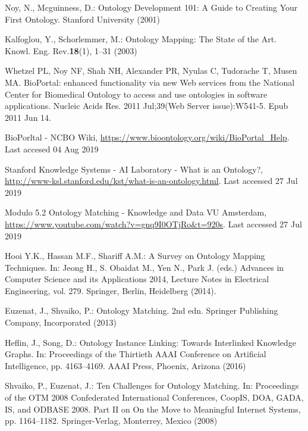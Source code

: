 \documentclass[runningheads]{llncs}
\begin{document}
%
%
%
% 
% 
%
\begin{thebibliography}{8}

Noy, N., Mcguinness, D.: Ontology Development 101: A Guide to Creating Your First Ontology. Stanford University (2001)

Kalfoglou, Y., Schorlemmer, M.: Ontology Mapping: The State of the Art. Knowl. Eng. Rev.\textbf{18}(1), 1--31 (2003)

Whetzel PL, Noy NF, Shah NH, Alexander PR, Nyulas C, Tudorache T, Musen MA. BioPortal: enhanced functionality via new Web services from the National Center for Biomedical Ontology to access and use ontologies in software applications. Nucleic Acids Res. 2011 Jul;39(Web Server issue):W541-5. Epub 2011 Jun 14.

BioPorltal - NCBO Wiki, \url{https://www.bioontology.org/wiki/BioPortal_Help}. Last accesed 04 Aug 2019

Stanford Knowledge Systems - AI Laboratory - What is an Ontology?, \url{http://www-ksl.stanford.edu/kst/what-is-an-ontology.html}. Last accessed 27 Jul 2019

Modulo 5.2 Ontology Matching - Knowledge and Data VU Amsterdam, \url{https://www.youtube.com/watch?v=gnq9I0OTjRo\&t=920s}. Last accessed 27 Jul 2019

Hooi Y.K., Hassan M.F., Shariff A.M.: A Survey on Ontology Mapping Techniques. In: Jeong H., S. Obaidat M., Yen N., Park J. (eds.) Advances in Computer Science and its Applications 2014, Lecture Notes in Electrical Engineering, vol. 279.
Springer, Berlin, Heidelberg (2014). 

Euzenat, J., Shvaiko, P.: Ontology Matching. 2nd edn. Springer Publishing Company, Incorporated (2013)

Heflin, J., Song, D.: Ontology Instance Linking: Towards Interlinked Knowledge Graphs. In: Proceedings of the Thirtieth AAAI Conference on Artificial Intelligence, pp. 4163--4169. AAAI Press, Phoenix, Arizona (2016)

Shvaiko, P., Euzenat, J.: Ten Challenges for Ontology Matching. In: Proceedings of the OTM 2008 Confederated International Conferences, CoopIS, DOA, GADA, IS, and ODBASE 2008. Part II on On the Move to Meaningful Internet Systems, pp. 1164--1182. Springer-Verlag, Monterrey, Mexico (2008)


\end{thebibliography}
\end{document}

